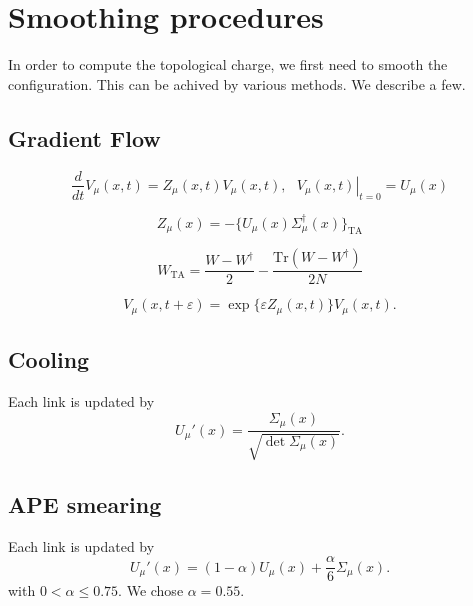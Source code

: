 \documentclass[12pt,a4paper]{article}
\begin{document}
\section{Smoothing procedures}

In order to compute the topological charge, we first need to smooth the configuration. This can be achived by various methods. We describe a few.

\subsection{Gradient Flow}
\begin{equation}
    \frac{d}{dt}V_{\mu}(x,t) = Z_{\mu}(x,t)V_{\mu}(x,t) , \ \ \  \left. {V_{\mu}(x,t)}\right|_{t = 0} = U_{\mu}(x)
\end{equation}

\begin{equation}
         Z_{\mu}(x) = -\{U_{\mu}(x)\Sigma_{\mu}^{\dagger}(x)\}_{\text{TA}}
\end{equation}

\begin{equation}
    W_{\text{TA}} = \frac{W - W^{\dagger}}{2} - \frac{\text{Tr} (W - W^{\dagger})}{2N}
\end{equation}

\begin{equation}
    V_{\mu}(x,t+\varepsilon) = \exp\{\varepsilon Z_{\mu}(x,t)\}V_{\mu}(x,t).
\end{equation}
%



\subsection{Cooling}
Each link is updated by
\begin{equation}
    U_{\mu}'(x) = \frac{\Sigma_{\mu}(x)}{\sqrt{\det \Sigma_{\mu}(x)}}.
\end{equation}
\subsection{APE smearing}
Each link is updated by 
\begin{equation}
    U_{\mu}'(x) = (1-\alpha)U_{\mu}(x)+ \frac{\alpha}{6}\Sigma_{\mu}(x).
\end{equation}
with $0<\alpha\leq 0.75$. We chose $\alpha = 0.55$.
\end{document}
